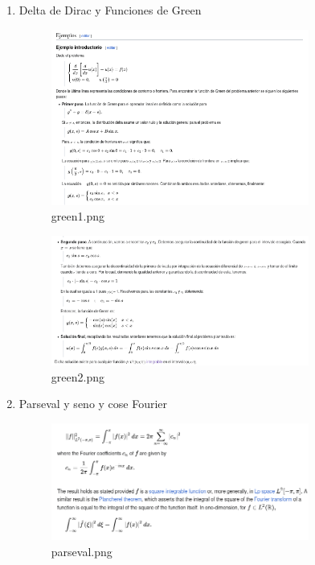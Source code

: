 \documentclass[12pt]{exam}
\begin{document}
\begin{enumerate}
  \item Delta de Dirac y Funciones de Green
    \begin{figure}[H]
      \centering
      \includegraphics[width=0.8\textwidth]{green1.png}
      \caption{green1.png}
      \label{fig:green1-png}
    \end{figure}
    \begin{figure}[H]
      \centering
      \includegraphics[width=0.8\textwidth]{green2.png}
      \caption{green2.png}
      \label{fig:green2-png}
    \end{figure}
  \item Parseval y seno y cose Fourier
    \begin{figure}[H]
      \centering
      \includegraphics[width=0.8\textwidth]{parseval.png}
      \caption{parseval.png}
      \label{fig:parseval-png}
    \end{figure}

\end{enumerate}
\end{document}
